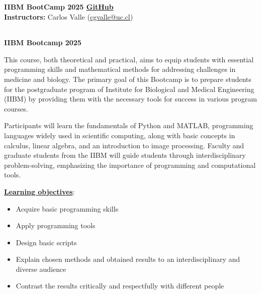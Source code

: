 \documentclass[letter,11pt]{article}
\begin{document}
	\begin{flushleft}\small
		\large{\textbf{IIBM BootCamp 2025 \href{https://github.com/cgvalle/IIBM-BootCamp-2025}{GitHub}}}\\
		\textbf{Instructors: } Carlos Valle (\href{mailto:cgvalle@uc.cl}{cgvalle@uc.cl})  
		\hspace{-0.37cm} \begin{tabular}{llllll}

\end{tabular}
\end{flushleft}





\begin{center}
\LARGE\textbf{IIBM Bootcamp 2025}\\
\end{center}



\large
This course, both theoretical and practical, aims to equip students with essential programming skills and mathematical methods for addressing challenges in medicine and biology. The primary goal of this Bootcamp is to prepare students for the postgraduate program of Institute for Biological and Medical Engineering (IIBM) by providing them with the necessary tools for success in various program courses.

Participants will learn the fundamentals of Python and MATLAB, programming languages widely used in scientific computing, along with basic concepts in calculus, linear algebra, and an introduction to image processing. Faculty and graduate students from the IIBM will guide students through interdisciplinary problem-solving, emphasizing the importance of programming and computational tools.

\vspace{0.3cm}

\underline{\textbf{Learning objectives}}:
\begin{itemize}
    \itemsep0em
    \item Acquire basic programming skills
    \item Apply programming tools
    \item Design basic scripts
    \item Explain chosen methods and obtained results to an interdisciplinary and diverse audience
    \item Contrast the results critically and respectfully with different people
    
\end{itemize}
\end{document}
